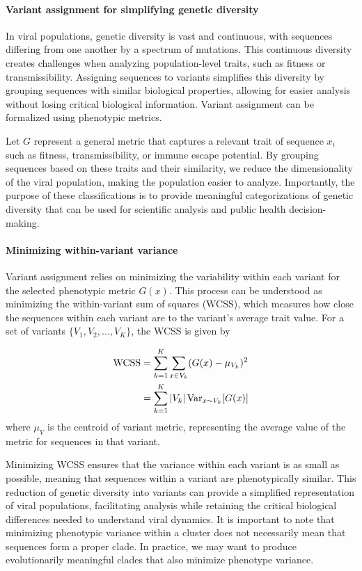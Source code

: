 \paragraph{Variant assignment for simplifying genetic diversity}

In viral populations, genetic diversity is vast and continuous, with sequences differing from one another by a spectrum of mutations. This continuous diversity creates challenges when analyzing population-level traits, such as fitness or transmissibility. Assigning sequences to variants simplifies this diversity by grouping sequences with similar biological properties, allowing for easier analysis without losing critical biological information.
Variant assignment can be formalized using phenotypic metrics.

Let $G$ represent a general metric that captures a relevant trait of sequence $x_i$ such as fitness, transmissibility, or immune escape potential.
By grouping sequences based on these traits and their similarity, we reduce the dimensionality of the viral population, making the population easier to analyze.
Importantly, the purpose of these classifications is to provide meaningful categorizations of genetic diversity that can be used for scientific analysis and public health decision-making.

\paragraph{Minimizing within-variant variance}

Variant assignment relies on minimizing the variability within each variant for the selected phenotypic metric $G(x)$.
This process can be understood as minimizing the within-variant sum of squares (WCSS), which measures how close the sequences within each variant are to the variant’s average trait value.
For a set of variants \( \{V_1, V_2, \dots, V_K\} \), the WCSS is given by

\begin{align}
\text{WCSS} &= \sum_{k=1}^{K} \sum_{x \in V_{k}} (G(x) - \mu_{V_k})^2\\
            &= \sum_{k=1}^{K} \left| V_k \right| \text{Var}_{x \sim V_k}[G(x)]
\end{align}
where $\mu_V$ is the centroid of variant metric, representing the average value of the metric for sequences in that variant.

Minimizing WCSS ensures that the variance within each variant is as small as possible, meaning that sequences within a variant are phenotypically similar.
This reduction of genetic diversity into variants can provide a simplified representation of viral populations, facilitating analysis while retaining the critical biological differences needed to understand viral dynamics.
It is important to note that minimizing phenotypic variance within a cluster does not necessarily mean that sequences form a proper clade.
In practice, we may want to produce evolutionarily meaningful clades that also minimize phenotype variance.

